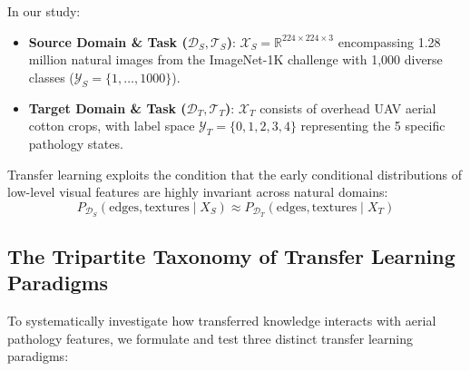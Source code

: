 \documentclass[11pt,a4paper]{article}
\begin{document}
In our study:
\begin{itemize}
    \item \textbf{Source Domain \& Task ($\mathcal{D}_S, \mathcal{T}_S$)}: $\mathcal{X}_S = \mathbb{R}^{224 \times 224 \times 3}$ encompassing 1.28 million natural images from the ImageNet-1K challenge with 1,000 diverse classes ($\mathcal{Y}_S = \{1, \dots, 1000\}$).
    \item \textbf{Target Domain \& Task ($\mathcal{D}_T, \mathcal{T}_T$)}: $\mathcal{X}_T$ consists of overhead UAV aerial cotton crops, with label space $\mathcal{Y}_T = \{0, 1, 2, 3, 4\}$ representing the 5 specific pathology states.
\end{itemize}

Transfer learning exploits the condition that the early conditional distributions of low-level visual features are highly invariant across natural domains:
\begin{equation}
    P_{\mathcal{D}_S}(\text{edges}, \text{textures} \mid X_S) \approx P_{\mathcal{D}_T}(\text{edges}, \text{textures} \mid X_T)
\end{equation}

\subsection{The Tripartite Taxonomy of Transfer Learning Paradigms}
To systematically investigate how transferred knowledge interacts with aerial pathology features, we formulate and test three distinct transfer learning paradigms:
\end{document}
